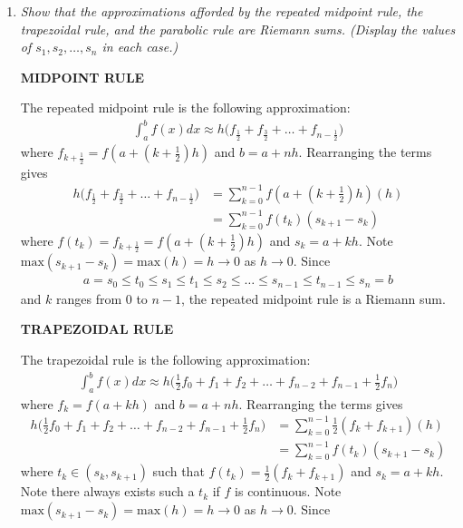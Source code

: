 \documentclass[12pt]{article}
\begin{document}
\begin{enumerate}[\it\ \ (a)\ \ ]
	\item {\it Show that the approximations afforded by the repeated midpoint rule, the trapezoidal rule, and the parabolic rule are Riemann sums. (Display the values of $s_1, s_2, \dots, s_n$ in each case.)}
	\begin{center}
		\bf MIDPOINT RULE
	\end{center}
	\noindent The repeated midpoint rule is the following approximation:
	\begin{align*}
		\int_a^b f(x) dx \approx h\Big(f_\frac{1}{2} + f_\frac{3}{2} + \dots + f_{n - \frac{1}{2}}\Big)
	\end{align*}
	where $f_{k + \frac{1}{2}} = f(a + (k + \frac{1}{2})h)$ and $b = a + nh$.  Rearranging the terms gives
	\begin{align*}
		h\Big(f_\frac{1}{2} + f_\frac{3}{2} + \dots + f_{n - \frac{1}{2}}\Big) &= \sum_{k = 0}^{n-1}f(a + (k + \textstyle\frac{1}{2})h)(h) \\
		&= \sum_{k = 0}^{n-1}f(t_k)(s_{k+1} - s_k)
	\end{align*}
	where $f(t_k) = f_{k + \frac{1}{2}} = f(a + (k + \frac{1}{2})h)$ and $s_k = a + kh$.  Note $\text{max}(s_{k+1} - s_k) = \text{max}(h) = h \rightarrow 0$ as $h \rightarrow 0$.  Since
	\begin{align*}
		a = s_0 \leq t_0 \leq s_1 \leq t_1 \leq s_2 \leq \dots \leq s_{n-1} \leq t_{n-1} \leq s_n = b
	\end{align*}
	and $k$ ranges from $0$ to $n-1$, the repeated midpoint rule is a Riemann sum.
	\pagebreak
	\begin{center}
		\bf TRAPEZOIDAL RULE
	\end{center}
	\noindent The trapezoidal rule is the following approximation:
	\begin{align*}
		\int_a^b f(x) dx \approx h\Big(\textstyle\frac{1}{2}f_0 + f_1 + f_2 + \dots + f_{n-2} + f_{n-1} + \textstyle\frac{1}{2}f_n\Big)
	\end{align*}
	where $f_k = f(a + kh)$ and $b = a + nh$.  Rearranging the terms gives
	\begin{align*}
		h\Big(\textstyle\frac{1}{2}f_0 + f_1 + f_2 + \dots + f_{n-2} + f_{n-1} + \textstyle\frac{1}{2}f_n\Big) &= \sum_{k = 0}^{n-1}\textstyle\frac{1}{2}(f_k + f_{k+1})(h) \\
		&= \sum_{k = 0}^{n-1}f(t_k)(s_{k+1} - s_k)
	\end{align*}
	where $t_k \in (s_k, s_{k+1})$ such that $f(t_k) = \frac{1}{2}(f_k + f_{k+1})$ and $s_k = a + kh$.  Note there always exists such a $t_k$ if $f$ is continuous.  Note $\text{max}(s_{k+1} - s_k) = \text{max}(h) = h \rightarrow 0$ as $h \rightarrow 0$.  Since

\end{enumerate}
\end{document}
